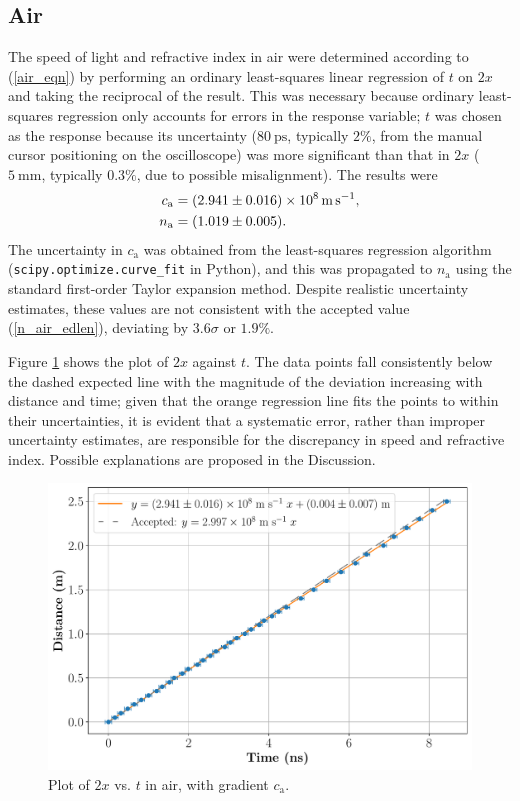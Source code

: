 \documentclass[
    aps,
    prl,
    reprint,
    10pt,
    amsmath,
    amssymb,
    a4paper,
    longbibliography
]{revtex4-2}
\begin{document}
\subsection{Air}
The speed of light and refractive index in air were determined according
to (\ref{air_eqn}) by performing an ordinary least-squares linear
regression of $t$ on $2x$ and taking the reciprocal of the result.
This was necessary because ordinary least-squares regression only
accounts for errors in the response variable; $t$ was chosen as the
response because its uncertainty ($\SI{80}{\pico\second}$,
typically $2\%$, from the manual cursor positioning on the oscilloscope)
was more significant than that in $2x$ ($\SI{5}{\milli\meter}$,
typically $0.3\%$, due to possible misalignment). The results were
\begin{align*}
    c_\mathrm{a} &= \SI{2.941 \pm 0.016e8}{\meter \per\second}, \\
    n_\mathrm{a} &= \SI{1.019 \pm 0.005}{}.
\end{align*}
The uncertainty in $c_\mathrm{a}$ was obtained from the least-squares
regression algorithm (\verb|scipy.optimize.curve_fit| in Python),
and this was propagated to $n_\mathrm{a}$ using the standard
first-order Taylor expansion method. Despite realistic uncertainty
estimates, these values are not consistent with the accepted value
(\ref{n_air_edlen}), deviating by $3.6 \sigma$ or $1.9\%$.

Figure \ref{air_plot} shows the plot of $2x$ against $t$. The data points
fall consistently below the dashed expected line with the magnitude
of the deviation increasing with distance and time; given that the
orange regression line fits the points to within their uncertainties,
it is evident that a systematic error, rather than improper uncertainty
estimates, are responsible for the discrepancy in speed and refractive
index. Possible explanations are proposed in the Discussion.

\begin{figure}[ht]
    \centering
    \includegraphics[width=\linewidth]{air}
    \caption{Plot of $2x$ vs. $t$ in air, with gradient $c_\mathrm{a}$.}
    \label{air_plot}
\end{figure}
\end{document}
